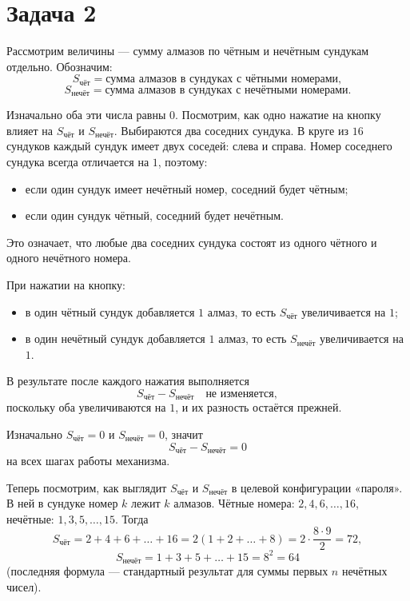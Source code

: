 \documentclass[12pt,a4paper]{article}
\begin{document}
\newpage

\section*{Задача 2}

Рассмотрим величины --- сумму алмазов по чётным и нечётным сундукам отдельно. Обозначим:
\[
S_{\text{чёт}} = \text{сумма алмазов в сундуках с чётными номерами},
\]
\[
S_{\text{нечёт}} = \text{сумма алмазов в сундуках с нечётными номерами}.
\]

Изначально оба эти числа равны $0$. Посмотрим, как одно нажатие на кнопку влияет на $S_{\text{чёт}}$ и $S_{\text{нечёт}}$. Выбираются два соседних сундука. В круге из $16$ сундуков каждый сундук имеет двух соседей: слева и справа. Номер соседнего сундука всегда отличается на $1$, поэтому:
\begin{itemize}
  \item если один сундук имеет нечётный номер, соседний будет чётным;
  \item если один сундук чётный, соседний будет нечётным.
\end{itemize}
Это означает, что любые два соседних сундука состоят из одного чётного и одного нечётного номера.

При нажатии на кнопку:
\begin{itemize}
  \item в один чётный сундук добавляется $1$ алмаз, то есть $S_{\text{чёт}}$ увеличивается на $1$;
  \item в один нечётный сундук добавляется $1$ алмаз, то есть $S_{\text{нечёт}}$ увеличивается на $1$.
\end{itemize}
В результате после каждого нажатия выполняется
\[
S_{\text{чёт}} - S_{\text{нечёт}} \quad \text{не изменяется},
\]
поскольку оба увеличиваются на $1$, и их разность остаётся прежней.

Изначально $S_{\text{чёт}} = 0$ и $S_{\text{нечёт}} = 0$, значит
\[
S_{\text{чёт}} - S_{\text{нечёт}} = 0
\]
на всех шагах работы механизма.

Теперь посмотрим, как выглядит $S_{\text{чёт}}$ и $S_{\text{нечёт}}$ в целевой конфигурации «пароля». В ней в сундуке номер $k$ лежит $k$ алмазов. Чётные номера: $2,4,6,\dots,16$, нечётные: $1,3,5,\dots,15$. Тогда
\[
S_{\text{чёт}} = 2 + 4 + 6 + \dots + 16 = 2(1 + 2 + \dots + 8) = 2 \cdot \frac{8 \cdot 9}{2} = 72,
\]
\[
S_{\text{нечёт}} = 1 + 3 + 5 + \dots + 15 = 8^2 = 64
\]
(последняя формула --- стандартный результат для суммы первых $n$ нечётных чисел).
\end{document}
